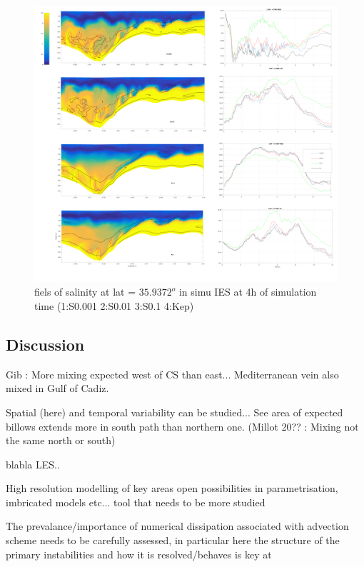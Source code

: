\begin{figure}[!h]
 \includegraphics[width=\textwidth]{./GBR3D/Figsmago.png}
 \caption {fiels of salinity at lat = $35.9372^o$ in simu IES at 4h of simulation time  (1:S0.001  2:S0.01  3:S0.1 4:Kep)}
\end{figure}

\subsection{Discussion}
Gib :
More mixing expected west of CS than east... Mediterranean vein also mixed in Gulf of Cadiz.

Spatial (here) and temporal variability can be studied... See area of expected billows extends more in south path than northern one. (Millot 20?? : Mixing not the same north or south)



blabla LES..

High resolution modelling of key areas open possibilities in parametrisation, imbricated models etc... tool that needs to be more studied 

The prevalance/importance of numerical dissipation associated with advection scheme needs to be carefully assessed, in particular here the structure of the primary instabilities and how it is resolved/behaves is key at 

